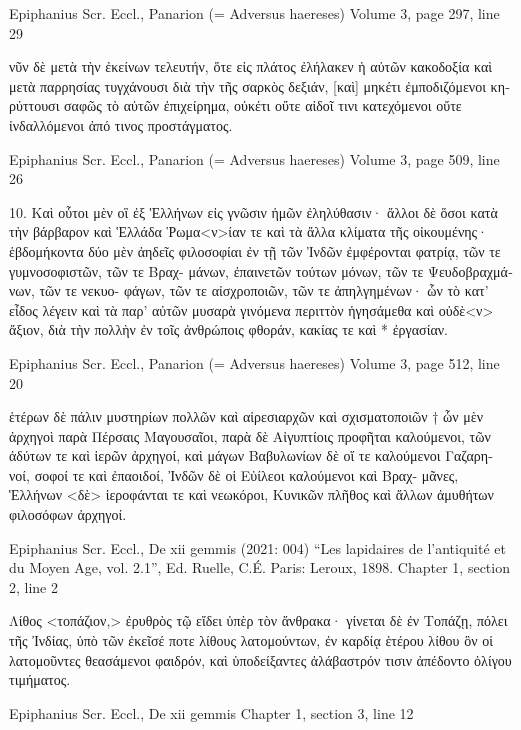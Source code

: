 \documentclass[12pt,letterpaper,twoside,final]{memoir}
\begin{document}
\begin{greek}
Epiphanius Scr. Eccl., Panarion (= Adversus haereses) 
Volume 3, page 297, line 29

                                                                            νῦν 
δὲ μετὰ τὴν ἐκείνων τελευτήν, ὅτε εἰς πλάτος ἐλήλακεν ἡ αὐτῶν κακοδοξία 
καὶ μετὰ παρρησίας τυγχάνουσι διὰ τὴν τῆς σαρκὸς δεξιάν, [καὶ] μηκέτι 
ἐμποδιζόμενοι κηρύττουσι σαφῶς τὸ αὐτῶν ἐπιχείρημα, οὐκέτι οὔτε 
αἰδοῖ τινι κατεχόμενοι οὔτε ἰνδαλλόμενοι ἀπό τινος προστάγματος. 



Epiphanius Scr. Eccl., Panarion (= Adversus haereses) 
Volume 3, page 509, line 26

10. Καὶ οὗτοι μὲν οἳ ἐξ Ἑλλήνων εἰς γνῶσιν ἡμῶν ἐληλύθασιν· 
ἄλλοι δὲ ὅσοι κατὰ τὴν βάρβαρον καὶ Ἑλλάδα Ῥωμα<ν>ίαν τε καὶ τὰ 
ἄλλα κλίματα τῆς οἰκουμένης· ἑβδομήκοντα δύο μὲν ἀηδεῖς φιλοσοφίαι ἐν 
τῇ τῶν Ἰνδῶν ἐμφέρονται φατρίᾳ, τῶν τε γυμνοσοφιστῶν, τῶν τε Βραχ-
μάνων, ἐπαινετῶν τούτων μόνων, τῶν τε Ψευδοβραχμάνων, τῶν τε νεκυο-
φάγων, τῶν τε αἰσχροποιῶν, τῶν τε ἀπηλγημένων· ὧν τὸ κατ' εἶδος 
λέγειν καὶ τὰ παρ' αὐτῶν μυσαρὰ γινόμενα περιττὸν ἡγησάμεθα καὶ 
οὐδὲ<ν> ἄξιον, διὰ τὴν πολλὴν ἐν τοῖς ἀνθρώποις φθοράν, κακίας τε 
καὶ * ἐργασίαν. 



Epiphanius Scr. Eccl., Panarion (= Adversus haereses) 
Volume 3, page 512, line 20

                                           ἑτέρων δὲ πάλιν μυστηρίων πολλῶν 
καὶ αἱρεσιαρχῶν καὶ σχισματοποιῶν † ὧν μὲν ἀρχηγοὶ παρὰ Πέρσαις 
Μαγουσαῖοι, παρὰ δὲ Αἰγυπτίοις προφῆται καλούμενοι, τῶν ἀδύτων 
τε καὶ ἱερῶν ἀρχηγοί, καὶ μάγων Βαβυλωνίων δὲ οἵ τε καλούμενοι Γαζαρη-
νοί, σοφοί τε καὶ ἐπαοιδοί, Ἰνδῶν δὲ οἱ Εὐίλεοι καλούμενοι καὶ Βραχ-
μᾶνες, Ἑλλήνων <δὲ> ἱεροφάνται τε καὶ νεωκόροι, Κυνικῶν πλῆθος 
καὶ ἄλλων ἀμυθήτων φιλοσόφων ἀρχηγοί. 



Epiphanius Scr. Eccl., De xii gemmis (2021: 004)
“Les lapidaires de l'antiquité et du Moyen Age, vol. 2.1”, Ed. Ruelle, C.É.
Paris: Leroux, 1898.
Chapter 1, section 2, line 2

Λίθος <τοπάζιον,> ἐρυθρὸς τῷ εἴδει ὑπὲρ τὸν ἄνθρακα· γίνεται δὲ ἐν Τοπάζῃ, 
πόλει τῆς Ἰνδίας, ὑπὸ τῶν ἐκεῖσέ ποτε λίθους λατομούντων, ἐν καρδίᾳ ἑτέρου 
λίθου ὃν οἱ λατομοῦντες θεασάμενοι φαιδρόν, καὶ ὑποδείξαντες ἀλάβαστρόν τισιν 
ἀπέδοντο ὀλίγου τιμήματος. 



Epiphanius Scr. Eccl., De xii gemmis 
Chapter 1, section 3, line 12


\end{greek}
\end{document}

